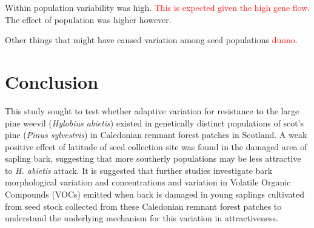 \documentclass[a4paper, 11pt]{article}
\newcommand{\todo}[1]{\textcolor{red}{#1}}   %
\begin{document}
Within population variability was high. \todo{This is expected given the high gene flow}. The effect of population was higher however.

Other things that might have caused variation among seed populations \todo{dunno}.


\section*{Conclusion}

This study sought to test whether adaptive variation for resistance to the large pine weevil (\textit{Hylobius abietis}) existed in genetically distinct populations of scot's pine (\textit{Pinus sylvestris}) in Caledonian remnant forest patches in Scotland. A weak positive effect of latitude of seed collection site was found in the damaged area of sapling bark, suggesting that more southerly populations may be less attractive to \textit{H. abietis} attack. It is suggested that further studies investigate bark morphological variation and concentrations and variation in Volatile Organic Compounds (VOCs) emitted when bark is damaged in young saplings cultivated from seed stock collected from these Caledonian remnant forest patches to understand the underlying mechanism for this variation in attractiveness. 



\end{document}
